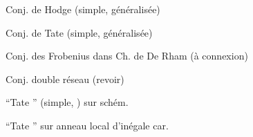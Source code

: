 Conj. de Hodge (simple, généralisée)

Conj. de Tate (simple, généralisée)

Conj. des Frobenius dans Ch. de De Rham (à connexion)

Conj.  double réseau (revoir)

``Tate '' (simple, ) sur schém.

``Tate '' sur anneau local d'inégale car.
